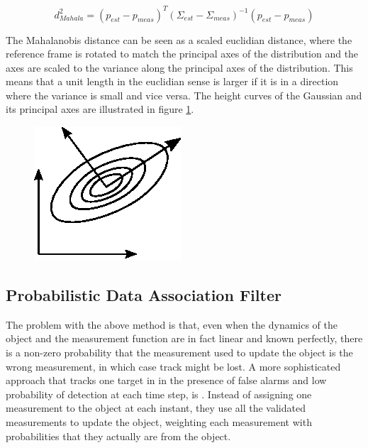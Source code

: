 \begin{equation}
    d^2_{Mahala} = (p_{est} - p_{meas})^T(\Sigma_{est} - \Sigma_{meas})^{-1}(p_{est} - p_{meas})
\end{equation}

The Mahalanobis distance can be seen as a scaled euclidian distance, where the reference frame is rotated to match the principal axes of the distribution and the axes are scaled to the variance along the principal axes of the distribution. This means that a unit length in the euclidian sense is larger if it is in a direction where the variance is small and vice versa. The height curves of the Gaussian and its principal axes are illustrated in figure \ref{Fig:GaussianPrincipalAxes}. 

\begin{figure}
    \centering
    \includegraphics[width=0.5\linewidth]{0_Images/3_Theory/GaussianPrincipalAxis.eps}
    \label{Fig:GaussianPrincipalAxes}
\end{figure}

\subsection{Probabilistic Data Association Filter}

The problem with the above method is that, even when the dynamics of the object and the measurement function are in fact linear and known perfectly, there is a non-zero probability that the measurement used to update the object is the wrong measurement, in which case track might be lost. A more sophisticated approach that tracks one target in in the presence of false alarms and low probability of detection at each time step, is \cite{BarShalomPDA}. Instead of assigning one measurement to the object at each instant, they use all the validated measurements to update the object, weighting each measurement with probabilities that they actually are from the object.  

